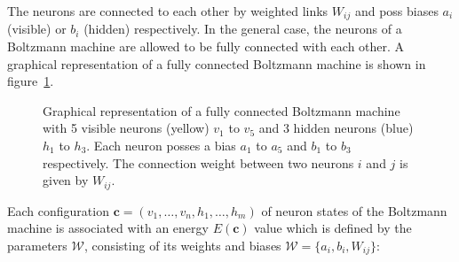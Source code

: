 The neurons are 
connected to each other by weighted links $W_{ij}$ and poss biases $a_i$ (visible) or $b_i$ (hidden) respectively. In the
general case, the neurons of a Boltzmann machine are allowed to be fully connected with each other. A graphical 
representation of a fully connected Boltzmann machine is shown in figure~\ref{fig:boltzmannMachine}.

\begin{figure}[H]
    \label{fig:boltzmannMachine}
    \centering
    \caption{Graphical representation of a fully connected Boltzmann machine with 5 visible neurons (yellow) $v_1$ to $v_5$
    and 3 hidden neurons (blue) $h_1$ to $h_3$. Each neuron posses a bias
    $a_1$ to $a_5$ and $b_1$ to $b_3$ respectively. The connection weight between two neurons $i$ and $j$
    is given by $W_{ij}$.}
\end{figure}

Each configuration $\bm{c}=(v_1,\dots,v_n,h_1,\dots,h_m)$ of neuron states
of the Boltzmann machine is associated with an energy $E(\bm{c})$ value
which is defined by the parameters $\mathcal{W}$, consisting of its weights and 
biases $\mathcal{W} = \{a_i, b_i, W_{ij}\}$:

